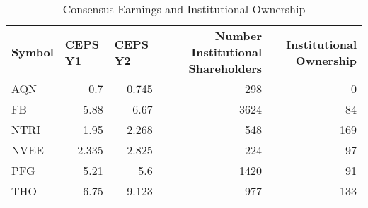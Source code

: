 \documentclass{article}
\begin{document}
\begin{table}[htbp]
  \caption{Consensus Earnings and Institutional Ownership}
    \begin{tabular}{lrrrr}
    \textbf{Symbol} & \multicolumn{1}{l}{\textbf{CEPS Y1}} & \multicolumn{1}{l}{\textbf{CEPS Y2}} & \multicolumn{1}{p{4.215em}}{\textbf{Number Institutional Shareholders}} & \multicolumn{1}{p{4.215em}}{\textbf{Institutional Ownership}} \\
    AQN   & 0.7   & 0.745 & 298   & 0 \\
    FB    & 5.88  & 6.67  & 3624  & 84 \\
    NTRI  & 1.95  & 2.268 & 548   & 169 \\
    NVEE  & 2.335 & 2.825 & 224   & 97 \\
    PFG   & 5.21  & 5.6   & 1420  & 91 \\
    THO   & 6.75  & 9.123 & 977   & 133 \\
    \end{tabular}%
  \label{tab:addlabel}%
\end{table}%
\end{document}
